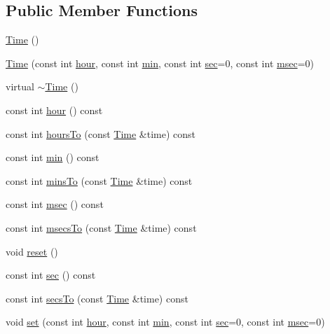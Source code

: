 \subsection*{Public Member Functions}
\begin{DoxyCompactItemize}
\item 
\hyperlink{classprism_1_1_time_a9cb33724bd39863cec83613c089d6f12}{Time} ()
\item 
\hyperlink{classprism_1_1_time_acdee4966daaf75f9b735744881481372}{Time} (const int \hyperlink{classprism_1_1_time_a380242e03982df8bf4af3eaa2296c808}{hour}, const int \hyperlink{classprism_1_1_time_afd27e4b1e093fed8253b10090c6090aa}{min}, const int \hyperlink{classprism_1_1_time_a83f655a9c7f1a2e8521ddcb395fa3796}{sec}=0, const int \hyperlink{classprism_1_1_time_a203ccb36ae3f75991b641e282350b280}{msec}=0)
\item 
virtual \hyperlink{classprism_1_1_time_a07e1c6bf7205b4451ac717a833b65968}{$\sim$\+Time} ()
\item 
const int \hyperlink{classprism_1_1_time_a380242e03982df8bf4af3eaa2296c808}{hour} () const 
\item 
const int \hyperlink{classprism_1_1_time_a759d033f1ef8602118fbe887eb8a2241}{hours\+To} (const \hyperlink{classprism_1_1_time}{Time} \&time) const 
\item 
const int \hyperlink{classprism_1_1_time_afd27e4b1e093fed8253b10090c6090aa}{min} () const 
\item 
const int \hyperlink{classprism_1_1_time_a654fe322a9b2aefe6ec9713bebf67fc7}{mins\+To} (const \hyperlink{classprism_1_1_time}{Time} \&time) const 
\item 
const int \hyperlink{classprism_1_1_time_a203ccb36ae3f75991b641e282350b280}{msec} () const 
\item 
const int \hyperlink{classprism_1_1_time_a91a3b84fe2e96f260ce05a64d44212d6}{msecs\+To} (const \hyperlink{classprism_1_1_time}{Time} \&time) const 
\item 
void \hyperlink{classprism_1_1_time_aff00f53fdc1e7b0eb249b6410d2cde28}{reset} ()
\item 
const int \hyperlink{classprism_1_1_time_a83f655a9c7f1a2e8521ddcb395fa3796}{sec} () const 
\item 
const int \hyperlink{classprism_1_1_time_a06e59e21a308459f3984a9680e431b32}{secs\+To} (const \hyperlink{classprism_1_1_time}{Time} \&time) const 
\item 
void \hyperlink{classprism_1_1_time_a7c67248f8370374686d1a61716b17485}{set} (const int \hyperlink{classprism_1_1_time_a380242e03982df8bf4af3eaa2296c808}{hour}, const int \hyperlink{classprism_1_1_time_afd27e4b1e093fed8253b10090c6090aa}{min}, const int \hyperlink{classprism_1_1_time_a83f655a9c7f1a2e8521ddcb395fa3796}{sec}=0, const int \hyperlink{classprism_1_1_time_a203ccb36ae3f75991b641e282350b280}{msec}=0)

\end{DoxyCompactItemize}
